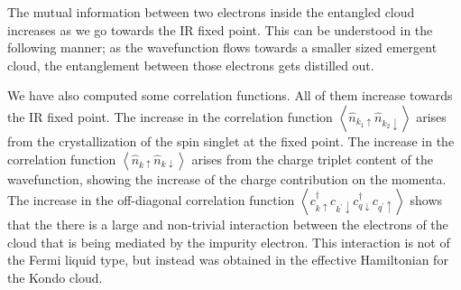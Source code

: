 The mutual information between two electrons inside the entangled cloud increases as we go towards the IR fixed point. This can be understood in the following manner; as the wavefunction flows towards a smaller sized emergent cloud, the entanglement between those electrons gets distilled out.

We have also computed some correlation functions. All of them increase towards the IR fixed point. The increase in the correlation function \(\left<\hat n_{k_1 \uparrow} \hat n_{k_2 \downarrow} \right>\) arises from the crystallization of the spin singlet at the fixed point. The increase in the correlation function \(\left<\hat n_{k \uparrow} \hat n_{k \downarrow} \right>\) arises from the charge triplet content of the wavefunction, showing the increase of the charge contribution on the momenta. The increase in the off-diagonal correlation function \(\left< c^\dagger_{k \uparrow}c_{k^\prime \downarrow}c^\dagger_{q \downarrow}c_{q^\prime \uparrow}\right>\) shows that the there is a large and non-trivial interaction between the electrons of the cloud that is being mediated by the impurity electron. This interaction is not of the Fermi liquid type, but instead was obtained in the effective Hamiltonian for the Kondo cloud.
